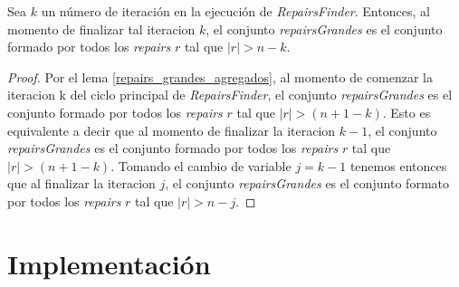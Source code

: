 \documentclass[11pt,a4paper,twoside]{tesis}
\begin{document}
\begin{lemma}\label{fin_iteracion_k_repairs}
Sea $k$ un número de iteración en la ejecución de \textit{RepairsFinder}. Entonces, al momento de finalizar tal iteracion $k$, el conjunto \textit{repairsGrandes} es el conjunto formado por todos los \textit{repairs} $r$ tal que $|r|>n-k$.
\end{lemma}

\begin{proof}
Por el lema \ref{repairs_grandes_agregados}, al momento de comenzar la iteracion k del ciclo principal de \textit{RepairsFinder}, el conjunto \textit{repairsGrandes} es el conjunto formado por todos los \textit{repairs} $r$ tal que $|r|>(n+ 1-k)$. Esto es equivalente a decir que al momento de finalizar la iteracion $k-1$, el conjunto \textit{repairsGrandes} es el conjunto formado por todos los  \textit{repairs} $r$ tal que $|r|>(n+ 1-k)$. Tomando el cambio de variable $j=k-1$ tenemos entonces que al finalizar la iteracion $j$, el conjunto \textit{repairsGrandes} es el conjunto formato por todos los \textit{repairs} $r$ tal que $|r|>n-j$.
\end{proof}

 







\chapter{Implementación}
\end{document}
